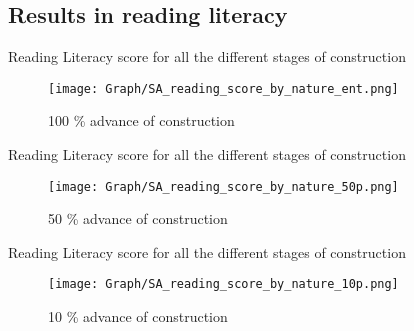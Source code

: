 \documentclass[9pt]{beamer}
\begin{document}
\subsection{Results in reading literacy}

\begin{frame}{Reading Literacy score for all the different stages of construction} 
\label{math100p}

    \begin{figure}
      \centering
      \texttt{[image: Graph/SA\_reading\_score\_by\_nature\_ent.png]} 
      \caption{\small 100 \% advance of construction   }
      \label{fig:6.1sub-first}
    \end{figure}
\end{frame}

\begin{frame}{Reading Literacy score for all the different stages of construction}
    \begin{figure}
      \centering
      \texttt{[image: Graph/SA\_reading\_score\_by\_nature\_50p.png]} 
      \caption{\small 50 \% advance of construction  }
      \label{fig:6.1sub-first}
    \end{figure}
\end{frame}

\begin{frame}{Reading Literacy score for all the different stages of construction}
    \begin{figure}
      \centering
      \texttt{[image: Graph/SA\_reading\_score\_by\_nature\_10p.png]} 
      \caption{\small 10 \% advance of construction 
       \hyperlink{result_read_}{ } }
      \label{fig:6.1sub-first}
    \end{figure}
\end{frame}








\end{document}
